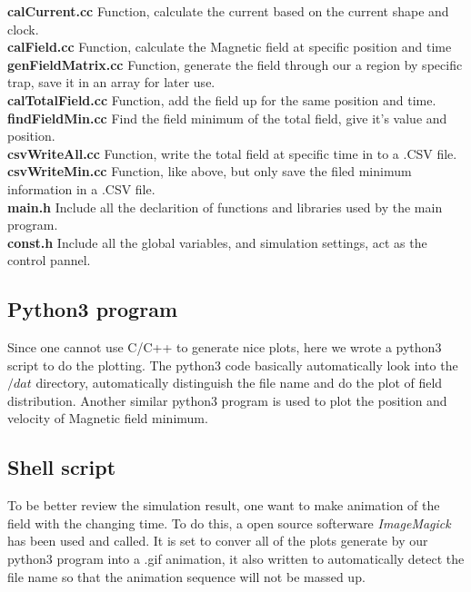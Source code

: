 \documentclass[11pt, xcolor=dvipsnames]{article}
\begin{document}
\textbf{calCurrent.cc} Function, calculate the current based on the current shape and clock.\\

\textbf{calField.cc} Function, calculate the Magnetic field at specific position and time\\

\textbf{genFieldMatrix.cc} Function, generate the field through our a region by specific trap, save it in an array for later use.\\

\textbf{calTotalField.cc} Function, add the field up for the same position and time.\\

\textbf{findFieldMin.cc} Find the field minimum of the total field, give it's value and position.\\

\textbf{csvWriteAll.cc} Function, write the total field at specific time in to a .CSV file.\\

\textbf{csvWriteMin.cc} Function, like above, but only save the filed minimum information in a .CSV file. \\

\textbf{main.h} Include all the declarition of functions and libraries used by the main program.\\

\textbf{const.h} Include all the global variables, and simulation settings, act as the control pannel.\\

\subsection{Python3 program}
Since one cannot use C/C++ to generate nice plots, here we wrote a python3 script to do the plotting. The python3 code basically automatically look into the $/dat$ directory, automatically distinguish the file name and do the plot of field distribution. Another similar python3 program is used to plot the position and velocity of Magnetic field minimum.\\

\subsection{Shell script}
To be better review the simulation result, one want to make animation of the field with the changing time. To do this, a open source softerware \textit{ImageMagick} has been used and called. It is set to conver all of the plots generate by our python3 program into a .gif animation, it also written to automatically detect the file name so that the animation sequence will not be massed up.
\end{document}
